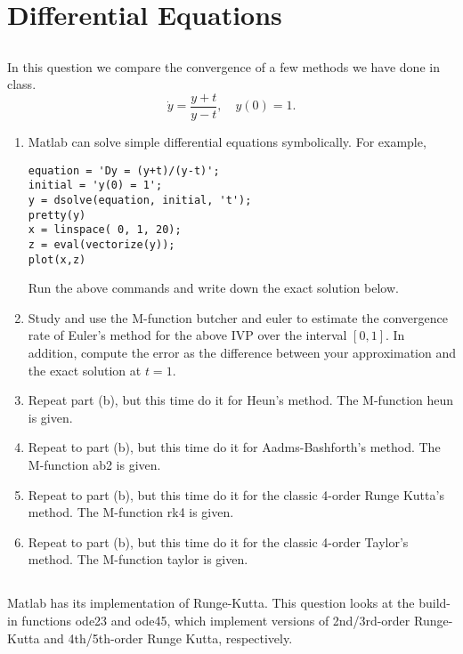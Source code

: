 \chapter{Differential Equations}

\section{}
In this question we compare the convergence of a few methods we have done in class.
\[ \dot{y}=\frac{y+t}{y-t}, \quad y(0)=1. \]
\begin{enumerate}
	\item Matlab can solve simple differential equations symbolically.
	For example,
	\begin{lstlisting}[style=Matlab-editor]
equation = 'Dy = (y+t)/(y-t)';
initial = 'y(0) = 1';
y = dsolve(equation, initial, 't');
pretty(y)
x = linspace( 0, 1, 20);
z = eval(vectorize(y));
plot(x,z)
	\end{lstlisting}
	Run the above commands and write down the exact solution below.
	\item Study and use the M-function butcher and euler to estimate the convergence rate of Euler's method for the above IVP over the interval \([0, 1]\).
	In addition, compute the error as the difference between your approximation and the exact solution at \(t = 1\).
	
	
	\item Repeat part (b), but this time do it for Heun's method.
	The M-function heun is given.
	
	\item Repeat to part (b), but this time do it for Aadms-Bashforth's method.
	The M-function ab2 is given.
	
	\item Repeat to part (b), but this time do it for the classic 4-order Runge Kutta's method.
	The M-function rk4 is given.
	
	\item Repeat to part (b), but this time do it for the classic 4-order Taylor's method.
	The M-function taylor is given.
	
\end{enumerate}


\section{}
Matlab has its implementation of Runge-Kutta.
This question looks at the build-in functions ode23 and ode45, which implement versions of 2nd/3rd-order Runge-Kutta and 4th/5th-order Runge Kutta, respectively.